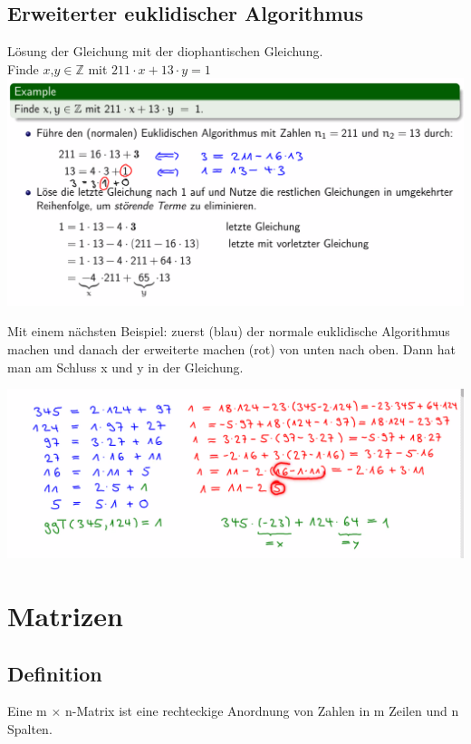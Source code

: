 \documentclass[12pt]{scrartcl}
\begin{document}
\newpage
\subsection{Erweiterter euklidischer Algorithmus}
Lösung der Gleichung mit der diophantischen Gleichung.\\

Finde $x$,$y \in \mathbb{Z}$ mit $211 \cdot x + 13 \cdot y = 1$\\ 

\includegraphics[width=14cm]{img/erweiterter_euklidischer_algorithmus.png}

Mit einem nächsten Beispiel: zuerst (blau) der normale euklidische Algorithmus machen
und danach der erweiterte machen (rot) von unten nach oben. Dann hat man am Schluss
x und y in der Gleichung.

\includegraphics[width=14cm]{img/erweiterter_euklidischer_algorithmus_beispiel2.png}

\newpage
\section{Matrizen}
\subsection{Definition}
Eine m $\times$ n-Matrix ist eine rechteckige Anordnung von Zahlen in m Zeilen und n
Spalten.\\
\end{document}
